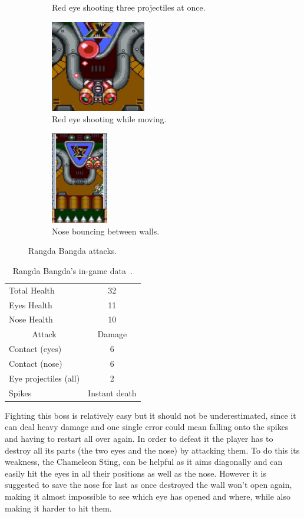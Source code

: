 \begin{figure}[htp]
\begin{subfigure}[t]{0.30\linewidth}
		\caption{Red eye shooting three projectiles at once.}
	\end{subfigure}
	\begin{subfigure}{0.40\linewidth}
		\centering
		\includegraphics[height=4cm]{figures/X1/Sigma_stages/Rangda_red_2.jpg}
		\caption{Red eye shooting while moving.}
	\end{subfigure}
	\hfil
	\begin{subfigure}{0.30\linewidth}
		\centering
		\includegraphics[height=4cm]{figures/X1/Sigma_stages/Rangda_nose.jpg}
		\caption{Nose bouncing between walls.}
	\end{subfigure}
	\caption{Rangda Bangda attacks.}
\end{figure} 

\begin{table}[htp]
	\centering
	\begin{tabular}[h]{l c}
		\toprule
		Total Health  & 32\\
		Eyes Health & 11\\
		Nose Health & 10\\
		\midrule
		\multicolumn{1}{c}{Attack} & \multicolumn{1}{c}{Damage}\\
		Contact (eyes) & 6\\
		Contact (nose) & 6\\
		Eye projectiles (all) & 2\\
		Spikes & Instant death\\
		\bottomrule
	\end{tabular}
	\caption{Rangda Bangda's in-game data~\cite{wiki:Rangda_bangda}. }
\end{table}
Fighting this boss is relatively easy but it should not be underestimated, since it can deal heavy damage and one single error could mean falling onto the spikes and having to restart all over again. In order to defeat it the player has to destroy all its parts (the two eyes and the nose)  by attacking them. To do this its weakness, the Chameleon Sting, can be helpful as it aims diagonally and can easily hit the eyes in all their positions as well as the nose. However it is suggested to save the nose for last as once destroyed the wall won't open again, making it almost impossible to see which eye has opened and where, while also making it harder to hit them.


